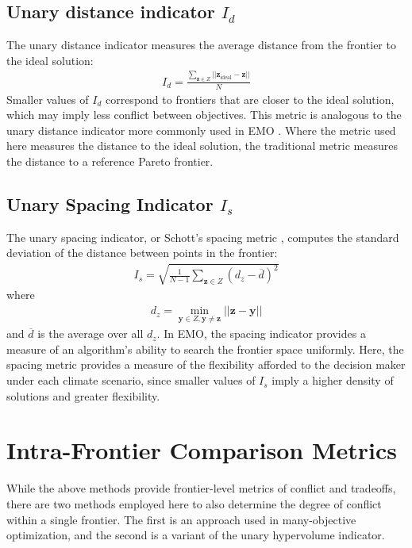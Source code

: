 \subsection{Unary distance indicator $I_d$} The unary distance indicator measures the average distance from the frontier to the ideal solution:
\begin{align}
I_d = \frac{\sum_{\mathbf{z} \in Z} ||\mathbf{z}_{\text{ideal}} - \mathbf{z} ||}{N}
\end{align}
Smaller values of $I_d$ correspond to frontiers that are closer to the ideal solution, which may imply less conflict between objectives. This metric is analogous to the unary distance indicator more commonly used in EMO \cite{czyzzak1998pareto}. Where the metric used here measures the distance to the ideal solution, the traditional metric measures the distance to a reference Pareto frontier.

\subsection{Unary Spacing Indicator $I_s$} The unary spacing indicator, or Schott's spacing metric \cite{schott1995fault}, computes the standard deviation of the distance between points in the frontier:
\begin{align}
I_s = \sqrt{\frac{1}{N-1} \sum_{\mathbf{z} \in Z} (d_z - \overbar{d})^2}
\end{align}
where
\begin{align}
d_z = \min_{\mathbf{y} \in Z, \mathbf{y} \neq \mathbf{z}} ||\mathbf{z} - \mathbf{y}||
\end{align}
and $\overbar{d}$ is the average over all $d_z$. In EMO, the spacing indicator provides a measure of an algorithm's ability to search the frontier space uniformly. Here, the spacing metric provides a measure of the flexibility afforded to the decision maker under each climate scenario, since smaller values of $I_s$ imply a higher density of solutions and greater flexibility.

\section{Intra-Frontier Comparison Metrics}
\label{sec:withinFrontierMetrics}
While the above methods provide frontier-level metrics of conflict and tradeoffs, there are two methods employed here to also determine the degree of conflict within a single frontier. The first is an approach used in many-objective optimization, and the second is a variant of the unary hypervolume indicator.

